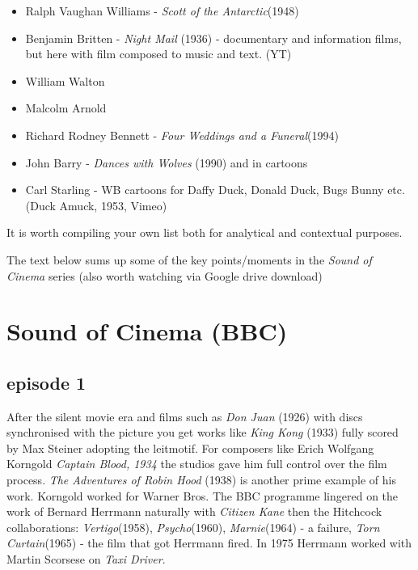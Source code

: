\begin{itemize}
\begin{quotation}
I feel that music on the screen can seek out and intensify the inner thoughts of the characters. It can invest a scene with terror, grandeur, gaiety, or misery. It can propel narrative swiftly forward, or slow it down. It often lifts mere dialogue into the realm of poetry. Finally, it is the communicating link between the screen and the audience, reaching out and enveloping all into one single experience.
\end{quotation}

and in the United Kingdom, none other than.

\item Ralph Vaughan Williams - \textit{Scott of the Antarctic}(1948)
\item Benjamin Britten - \textit{Night Mail} (1936) - documentary and information films, but here with film composed to music and text. (YT)
\item William Walton
\item Malcolm Arnold
\item Richard Rodney Bennett - \textit{Four Weddings and a Funeral}(1994)
\item John Barry - \textit{Dances with Wolves} (1990)
and in cartoons

\item Carl Starling - WB cartoons for Daffy Duck, Donald Duck, Bugs Bunny etc. (Duck Amuck, 1953,  Vimeo) 
\end{itemize}

It is worth compiling your own list both for analytical and contextual purposes.

The text below sums up some of the key points/moments in the \textit{Sound of Cinema} series (also worth watching via Google drive download)
\section{Sound of Cinema (BBC)}
\subsection{episode 1}
After the silent movie era and films such as \textit{Don Juan} (1926) with discs synchronised with the picture you get works like \textit{King Kong} (1933) fully scored by Max Steiner adopting the leitmotif. For composers like Erich Wolfgang Korngold \textit{Captain Blood, 1934} the studios gave him full control over the film process. \textit{The Adventures of Robin Hood} (1938) is another prime example of his work. Korngold worked for Warner Bros. 
The BBC programme lingered on the work of Bernard Herrmann naturally with \textit{Citizen Kane} then the Hitchcock collaborations: \textit{Vertigo}(1958), \textit{Psycho}(1960), \textit{Marnie}(1964) - a failure, \textit{Torn Curtain}(1965) - the film that got Herrmann fired. In 1975 Herrmann worked with Martin Scorsese on \textit{Taxi Driver}.

